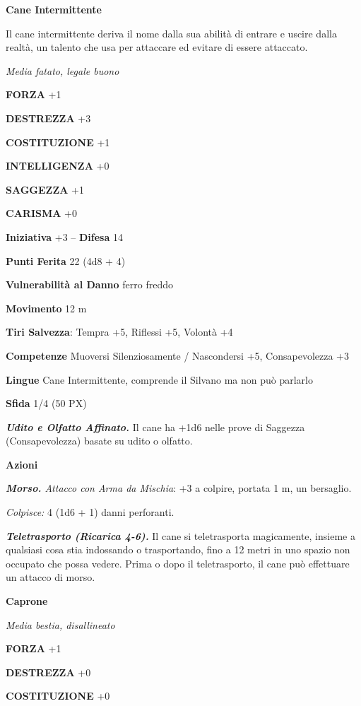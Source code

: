 \begin{multicols}{2}
\medskip\textbf{Cane Intermittente}

Il cane intermittente deriva il nome dalla sua abilità di entrare e uscire dalla realtà, un talento che usa per attaccare ed evitare di essere attaccato.

\textit{Media fatato, legale buono}

\textbf{FORZA} +1

\textbf{DESTREZZA} +3

\textbf{COSTITUZIONE} +1

\textbf{INTELLIGENZA} +0

\textbf{SAGGEZZA} +1

\textbf{CARISMA} +0

\textbf{Iniziativa} +3 -- \textbf{Difesa} 14

\textbf{Punti Ferita} 22 (4d8 + 4)

\textbf{Vulnerabilità al Danno} ferro freddo

\textbf{Movimento} 12 m

\textbf{Tiri Salvezza}: Tempra +5, Riflessi +5, Volontà +4

\textbf{Competenze} Muoversi Silenziosamente / Nascondersi +5, Consapevolezza +3

\textbf{Lingue} Cane Intermittente, comprende il Silvano ma non può parlarlo

\textbf{Sfida} 1/4 (50 PX)

\textit{\textbf{Udito e Olfatto Affinato.}} Il cane ha +1d6 nelle prove di Saggezza (Consapevolezza) basate su udito o olfatto.

\textbf{Azioni}

\textit{\textbf{Morso.} Attacco con Arma da Mischia}: +3 a colpire, portata 1 m, un bersaglio.

\textit{Colpisce:} 4 (1d6 + 1) danni perforanti.

\textit{\textbf{Teletrasporto (Ricarica 4-6).}} Il cane si teletrasporta magicamente, insieme a qualsiasi cosa stia indossando o trasportando, fino a 12 metri in uno spazio non occupato che possa vedere. Prima o dopo il teletrasporto, il cane può effettuare un attacco di morso.

\medskip\textbf{Caprone}

\textit{Media bestia, disallineato}

\textbf{FORZA} +1

\textbf{DESTREZZA} +0

\textbf{COSTITUZIONE} +0


\end{multicols}
